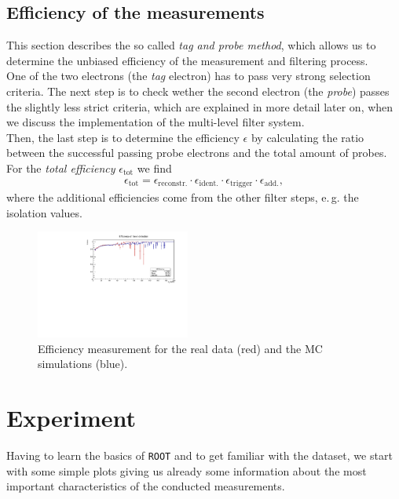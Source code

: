 \documentclass[twocolumn,
			   showpacs,%
               nofootinbib,
               aps,%
               prd,
               notitlepage,
               showkeys,
               10pt]{revtex4-1}
\begin{document}
\subsection{Efficiency of the measurements}
This section describes the so called \textit{tag and probe method}, which allows us to determine the unbiased efficiency of the measurement and filtering process.\\
One of the two electrons (the \textit{tag} electron) has to pass very strong selection criteria. The next step is to check wether the second electron (the \textit{probe}) passes the slightly less strict criteria, which are explained in more detail later on, when we discuss the implementation of the multi-level filter system. \\
Then, the last step is to determine the efficiency $\epsilon$ by calculating the ratio between the successful passing probe electrons and the total amount of probes.\\
For the \textit{total efficiency} $\epsilon_{\text{tot}}$ we find 
\begin{align}
	\epsilon_{\text{tot}} = \epsilon_{\text{reconstr.}} \cdot \epsilon_{\text{ident.}} \cdot \epsilon_{\text{trigger}} \cdot \epsilon_{\text{add.}},
\end{align}
 where the additional efficiencies come from the other filter steps, e.\,g. the isolation values. 

\begin{figure}[H]
\centering
\includegraphics[width=0.45\textwidth]{figures/plots/efficiency}
\caption{Efficiency measurement for the real data (red) and the MC simulations (blue).}
\end{figure}
\section{Experiment}

Having to learn the basics of \verb|ROOT| and to get familiar with the dataset, we start with some simple plots giving us already some information about the most important characteristics of the conducted measurements.\\
\end{document}
